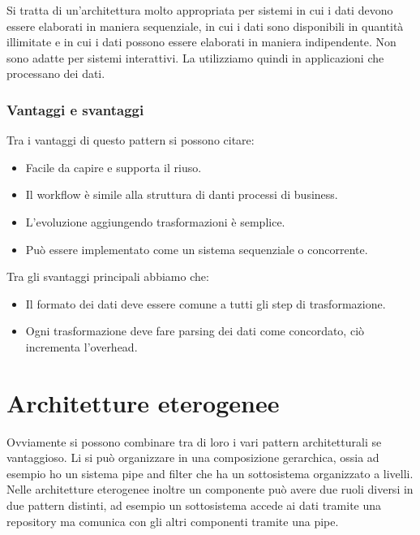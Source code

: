 Si tratta di un'architettura molto appropriata per sistemi in cui i dati devono
essere elaborati in maniera sequenziale, in cui i dati sono disponibili in
quantità illimitate e in cui i dati possono essere elaborati in maniera
indipendente. Non sono adatte per sistemi interattivi.
La utilizziamo quindi in applicazioni che processano dei dati.

\subsubsection{Vantaggi e svantaggi}
Tra i vantaggi di questo pattern si possono citare:
\begin{itemize}
    \item Facile da capire e supporta il riuso.
    \item Il workflow è simile alla struttura di danti processi di business.
    \item L'evoluzione aggiungendo trasformazioni è semplice.
    \item Può essere implementato come un sistema sequenziale o concorrente.
\end{itemize}

Tra gli svantaggi principali abbiamo che:
\begin{itemize}
    \item Il formato dei dati deve essere comune a tutti gli step di trasformazione.
    \item Ogni trasformazione deve fare parsing dei dati come concordato, ciò incrementa 
    l'overhead.
\end{itemize}
\section{Architetture eterogenee}
Ovviamente si possono combinare tra di loro i vari pattern architetturali se vantaggioso.
Li si può organizzare in una composizione gerarchica, ossia ad esempio ho un sistema pipe
and filter che ha un sottosistema organizzato a livelli.
Nelle architetture eterogenee inoltre un componente può avere due ruoli diversi
in due pattern distinti, ad esempio un sottosistema accede ai dati tramite
una repository ma comunica con gli altri componenti tramite una pipe.